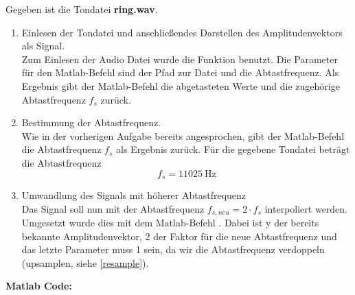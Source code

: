 Gegeben ist die Tondatei \textbf{ring.wav}.

\begin{enumerate}[label=\alph*)]
	\lstset{language=matlab}
	\item Einlesen der Tondatei und anschließendes Darstellen des Amplitudenvektors als Signal. \\
	Zum Einlesen der Audio Datei wurde die Funktion  benutzt. Die Parameter für den Matlab-Befehl sind der Pfad zur Datei und die Abtastfrequenz. Als Ergebnis gibt der Matlab-Befehl die abgetasteten Werte und die zugehörige Abtastfrequenz $f_s$ zurück. \vspace{4pt}\\
	
	\item Bestimmung der Abtastfrequenz. \\
	Wie in der vorherigen Aufgabe bereits angesprochen, gibt der Matlab-Befehl  die Abtastfrequenz $f_s$ als Ergebnis zurück. Für die gegebene Tondatei beträgt die Abtastfrequenz
	\begin{equation*}
		f_s = \SI{11025}{\Hz}
	\end{equation*}
	
	\item Umwandlung des Signals mit höherer Abtastfrequenz \\
	Das Signal soll nun mit der Abtastfrequenz $f_{s,neu} = 2 \cdot{f_s}$ interpoliert werden. Umgesetzt wurde dies mit dem Matlab-Befehl . Dabei ist y der bereits bekannte Amplitudenvektor, 2 der Faktor für  die neue Abtastfrequenz und das letzte Parameter muss 1 sein, da wir die Abtastfrequenz verdoppeln (upsamplen, siehe \ref{resample}). \vspace{4pt}\\
\end{enumerate}

\textbf{Matlab Code:}
